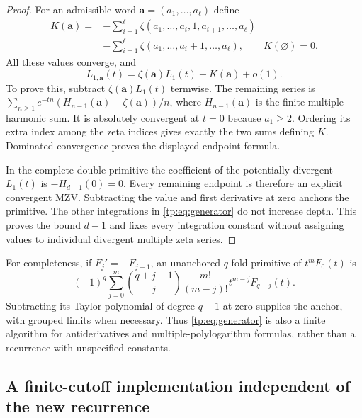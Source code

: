 \documentclass[11pt,a4paper]{article}
\numberwithin{equation}{section}
\theoremstyle{definition}
\theoremstyle{remark}
\begin{document}
\begin{proof}
For an admissible word $\boldsymbol a=(a_1,\ldots,a_\ell)$ define
\begin{align*}
 K(\boldsymbol a)={}&-\sum_{i=1}^{\ell}
 \zeta(a_1,\ldots,a_i,1,a_{i+1},\ldots,a_\ell)\\
 &-\sum_{i=1}^{\ell}
 \zeta(a_1,\ldots,a_i+1,\ldots,a_\ell),
 \qquad K(\varnothing)=0.
\end{align*}
All these values converge, and
\[
 L_{1,\boldsymbol a}(t)
       =\zeta(\boldsymbol a)L_1(t)+K(\boldsymbol a)+o(1).
\]
To prove this, subtract $\zeta(\boldsymbol a)L_1(t)$ termwise.
The remaining series is
$\sum_{n\ge1}e^{-tn}(H_{n-1}(\boldsymbol a)-\zeta(\boldsymbol a))/n$,
where $H_{n-1}(\boldsymbol a)$ is the finite multiple harmonic sum.
It is absolutely convergent at $t=0$ because $a_1\ge2$. Ordering its
extra index among the zeta indices gives exactly the two sums defining
$K$. Dominated convergence proves the displayed endpoint formula.

In the complete double primitive the coefficient of the potentially
divergent $L_1(t)$ is $-H_{d-1}(0)=0$. Every remaining endpoint is
therefore an explicit convergent MZV. Subtracting the value and first
derivative at zero anchors the primitive. The other integrations in
\eqref{tp:eq:generator} do not increase depth. This proves the bound
$d-1$ and fixes every integration constant without assigning values
to individual divergent multiple zeta series.
\end{proof}

For completeness, if $F_j'=-F_{j-1}$, an unanchored $q$-fold primitive
of $t^mF_0(t)$ is
\begin{equation}\label{tp:eq:finiteprimitive}
 (-1)^q\sum_{j=0}^m\binom{q+j-1}{j}
       \frac{m!}{(m-j)!}t^{m-j}F_{q+j}(t).
\end{equation}
Subtracting its Taylor polynomial of degree $q-1$ at zero supplies
the anchor, with grouped limits when necessary.  Thus
\eqref{tp:eq:generator} is also a finite algorithm for antiderivatives
and multiple-polylogarithm formulas, rather than a recurrence with
unspecified constants.

\subsection{A finite-cutoff implementation independent of the new recurrence}
\end{document}
